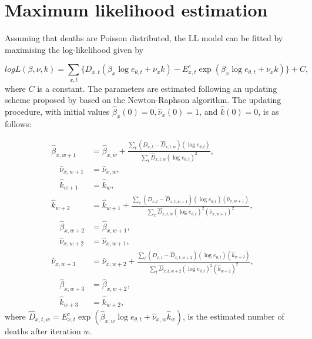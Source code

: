 \documentclass[risks,article,submit,moreauthors,pdftex]{Definitions/mdpi}
\begin{document}
\section{Maximum likelihood estimation}
\label{sec:PoissonMLE}

Assuming that deaths are Poisson distributed, the LL model can be fitted by maximising the log-likelihood given by 

\begin{equation}
\label{eq:MLE}
  log L(\beta ,\nu,k) = \sum_{x,t} \Big\{
  D_{x,t}(\beta_x\log{e_{\theta,t}} + \nu_xk) - 
  E_{x,t}^{c} \exp(\beta_x\log{e_{\theta,t}}+ \nu_xk) \Big\} + C,
\end{equation}
where $C$ is a constant. The parameters are estimated following an updating scheme proposed by \citet{brouhns2002} based on the Newton-Raphson algorithm. The updating procedure, with initial values $\hat{\beta}_x(0)=0, \hat{\nu}_x(0)=1$, and $\hat{k}(0)=0$, is as follows:

\begin{align*}
  \hat{\beta}_{x,w+1} & = \hat{\beta}_{x,w} + \frac{\sum_t(D_{x,t}-\hat{D}_{x,t,w})(\log{e_{\theta,t}})}{\sum_t\hat{D}_{x,t,w}(\log{e_{\theta,t}})^2}, \\
  \quad \hat{\nu}_{x,w+1} & =\hat{\nu}_{x,w}, \\
  \quad \hat{k}_{w+1} & = \hat{k}_w, \\
  \hat{k}_{w+2} & = \hat{k}_{w+1} + \frac{\sum_x(D_{x,t}-\hat{D}_{x,t,w+1})(\log{e_{\theta,t}})(\hat{\nu}_{x,w+1})}{\sum_x\hat{D}_{x,t,w}(\log{e_{\theta,t}})^2(\hat{\nu}_{x,w+1})^2}, \\
  \quad \hat{\beta}_{x,w+2} & =\hat{\beta}_{x,w+1}, \\
  \quad\hat{\nu}_{x,w+2} & = \hat{\nu}_{x,w+1}, \\
  \hat{\nu}_{x,w+3} & = \hat{\nu}_{x,w+2} + \frac{\sum_t(D_{x,t}-\hat{D}_{x,t,w+2})(\log{e_{\theta,t}})(\hat{k}_{w+2})}{\sum_t\hat{D}_{x,t,w+2}(\log{e_{\theta,t}})^2(\hat{k}_{w+2})^2}, \\
  \quad \hat{\beta}_{x,w+3} & =\hat{\beta}_{x,w+2}, \\
  \quad\hat{k}_{w+3} & =\hat{k}_{w+2},
\end{align*}
where $\hat{D}_{x,t,w} = E_{x,t}^{c} \exp(\hat{\beta}_{x,w}\log{e_{\theta,t}} + \hat{\nu}_{x,w}\hat{k}_w)$, is the estimated number of deaths after iteration $w$. %
\end{document}
